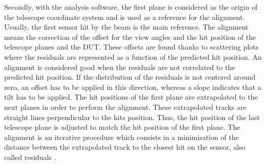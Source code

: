       
      Secondly, with the analysis software, the first plane is considered as the origin of the telescope coordinate system and is used as a reference for the alignment.
      Usually, the first sensor hit by the beam is the main reference.
      The alignment means the correction of the offset for the view angles and the hit position of the telescope planes and the \gls{DUT}.
      These offsets are found thanks to scattering plots where the residuals are represented as a function of the predicted hit position.
      An alignment is considered good when the residuals are not correlated to the predicted hit position.
      If the distribution of the residuals is not centered around zero, an offset has to be applied in this direction, whereas a slope indicates that a tilt has to be applied.
      The hit positions of the first plane are extrapolated to the next planes in order to perform the alignment.
      These extrapolated tracks are straight lines perpendicular to the hits position.
      Thus, the hit position of the last telescope plane is adjusted to match the hit position of the first plane.
      The alignment is an iterative procedure which consists in a minimisation of the distance between the extrapolated track to the closest hit on the sensor, also called residuals .     
     
